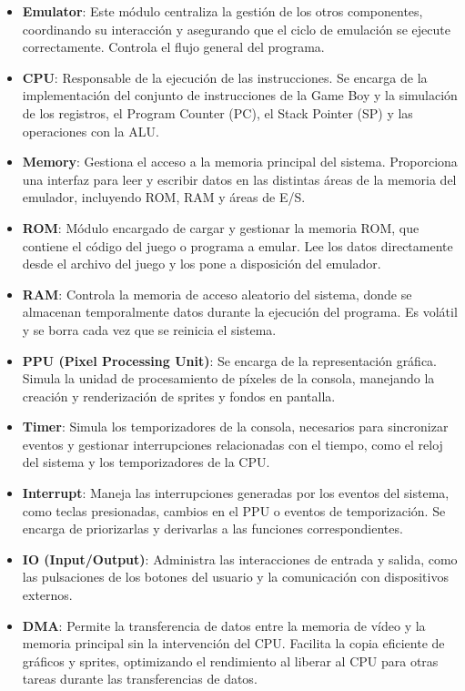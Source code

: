 \begin{itemize} 
    \item \textbf{Emulator}: Este módulo centraliza la gestión de los otros componentes, coordinando su interacción y asegurando que el ciclo de emulación se ejecute correctamente. Controla el flujo general del programa.
    \item \textbf{CPU}: Responsable de la ejecución de las instrucciones. Se encarga de la implementación del conjunto de instrucciones de la Game Boy y la simulación de los registros, el Program Counter (PC), el Stack Pointer (SP) y las operaciones con la ALU.
    \item \textbf{Memory}: Gestiona el acceso a la memoria principal del sistema. Proporciona una interfaz para leer y escribir datos en las distintas áreas de la memoria del emulador, incluyendo ROM, RAM y áreas de E/S.
    \item \textbf{ROM}: Módulo encargado de cargar y gestionar la memoria ROM, que contiene el código del juego o programa a emular. Lee los datos directamente desde el archivo del juego y los pone a disposición del emulador.
    \item \textbf{RAM}: Controla la memoria de acceso aleatorio del sistema, donde se almacenan temporalmente datos durante la ejecución del programa. Es volátil y se borra cada vez que se reinicia el sistema.
    \item \textbf{PPU (Pixel Processing Unit)}: Se encarga de la representación gráfica. Simula la unidad de procesamiento de píxeles de la consola, manejando la creación y renderización de sprites y fondos en pantalla.
    \item \textbf{Timer}: Simula los temporizadores de la consola, necesarios para sincronizar eventos y gestionar interrupciones relacionadas con el tiempo, como el reloj del sistema y los temporizadores de la CPU.
    \item \textbf{Interrupt}: Maneja las interrupciones generadas por los eventos del sistema, como teclas presionadas, cambios en el PPU o eventos de temporización. Se encarga de priorizarlas y derivarlas a las funciones correspondientes.
    \item \textbf{IO (Input/Output)}: Administra las interacciones de entrada y salida, como las pulsaciones de los botones del usuario y la comunicación con dispositivos externos.
    \item \textbf{DMA}: Permite la transferencia de datos entre la memoria de vídeo y la memoria principal sin la intervención del CPU. Facilita la copia eficiente de gráficos y sprites, optimizando el rendimiento al liberar al CPU para otras tareas durante las transferencias de datos.

\end{itemize}
